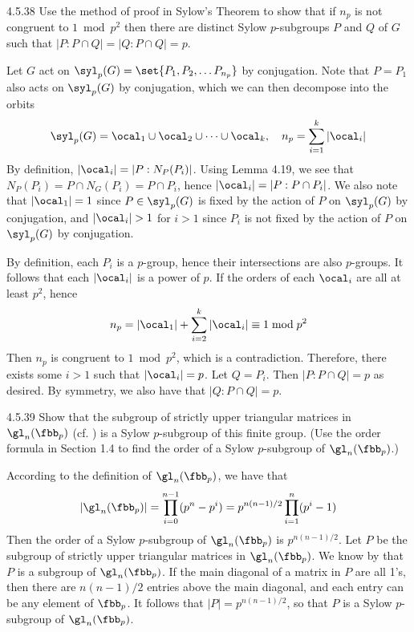 \begin{exercise}{4.5.38}
	Use the method of proof in Sylow's Theorem to show that if $n_p$ is not congruent to $1 \bmod p^2$ then there are distinct Sylow $p$-subgroups $P$ and $Q$ of $G$ such that $|P : P \cap Q| = |Q : P \cap Q| = p$.
\end{exercise}

\begin{sol}
	Let $G$ act on $\syl_p(G) = \set{P_1, P_2, \ldots P_{n_p}}$ by conjugation.
	Note that $P = P_1$ also acts on $\syl_p(G)$ by conjugation, which we can then decompose into the orbits
	\[
		\syl_p(G) = \ocal_1 \cup \ocal_2 \cup \cdots \cup \ocal_k, \quad n_p = \sum_{i = 1}^k |\ocal_i|
	\]
	By definition, $|\ocal_i| = |P : N_P(P_i)|$.
	Using Lemma 4.19, we see that $N_P(P_i) = P \cap N_G(P_i) = P \cap P_i$, hence $|\ocal_i| = |P : P \cap P_i|$.
	We also note that $|\ocal_1| = 1$ since $P \in \syl_p(G)$ is fixed by the action of $P$ on $\syl_p(G)$ by conjugation, and $|\ocal_i| > 1$ for $i > 1$ since $P_i$ is not fixed by the action of $P$ on $\syl_p(G)$ by conjugation.

	By definition, each $P_i$ is a $p$-group, hence their intersections are also $p$-groups.
	It follows that each $|\ocal_i|$ is a power of $p$.
	If the orders of each $\ocal_i$ are all at least $p^2$, hence
	\[
		n_p = |\ocal_1| + \sum_{i = 2}^k |\ocal_i| \equiv 1 \bmod p^2
	\]
	Then $n_p$ is congruent to $1 \bmod p^2$, which is a contradiction.
	Therefore, there exists some $i > 1$ such that $|\ocal_i| = p$.
	Let $Q = P_i$.
	Then $|P : P \cap Q| = p$ as desired.
	By symmetry, we also have that $|Q : P \cap Q| = p$.
\end{sol}

\begin{exercise}{4.5.39}
	Show that the subgroup of strictly upper triangular matrices in $\gl_n(\fbb_p)$ (cf. ) is a Sylow $p$-subgroup of this finite group. (Use the order formula in Section 1.4 to find the order of a Sylow $p$-subgroup of $\gl_n(\fbb_p)$.)
\end{exercise}

\begin{sol}
	According to the definition of $\gl_n(\fbb_p)$, we have that
	\[
		|\gl_n(\fbb_p)| = \prod_{i = 0}^{n-1} (p^n - p^i) = p^{n(n - 1)/2} \prod_{i = 1}^n (p^i - 1)
	\]
	Then the order of a Sylow $p$-subgroup of $\gl_n(\fbb_p)$ is $p^{n(n - 1)/2}$.
	Let $P$ be the subgroup of strictly upper triangular matrices in $\gl_n(\fbb_p)$.
	We know by  that $P$ is a subgroup of $\gl_n(\fbb_p)$.
	If the main diagonal of a matrix in $P$ are all 1's, then there are $n(n - 1)/2$ entries above the main diagonal, and each entry can be any element of $\fbb_p$.
	It follows that $|P| = p^{n(n - 1)/2}$, so that $P$ is a Sylow $p$-subgroup of $\gl_n(\fbb_p)$.
\end{sol}

